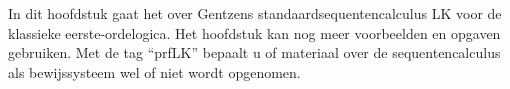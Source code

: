 \documentclass[../../../include/open-logic-chapter]{subfiles}
\begin{document}
      {}
      {}

\begin{editorial}
  In dit hoofdstuk gaat het over Gentzens standaardsequentencalculus LK
  voor de klassieke eerste-ordelogica. Het hoofdstuk kan nog meer
  voorbeelden en opgaven gebruiken. Met de tag ``prfLK'' bepaalt u of
  materiaal over de sequentencalculus als bewijssysteem wel of niet
  wordt opgenomen.
\end{editorial}














\OLEndChapterHook
\end{document}
